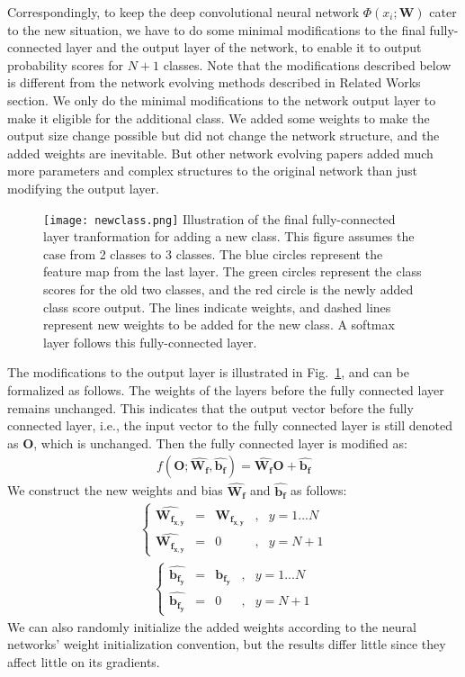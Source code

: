 Correspondingly, to keep the deep convolutional neural network $\Phi(x_i; \mathbf{W})$ cater to the new situation, we have to do some minimal modifications to the final fully-connected layer and the output layer of the network, to enable it to output probability scores for $N+1$ classes. Note that the modifications described below is different from the network evolving methods described in Related Works section. We only do the minimal modifications to the network output layer to make it eligible for the additional class. We added some weights to make the output size change possible but did not change the network structure, and the added weights are inevitable. But other network evolving papers added much more parameters and complex structures to the original network than just modifying the output layer.
\begin{figure}[!htp]
	\centering
	\texttt{[image: newclass.png]}
	{Illustration of the final fully-connected layer tranformation for adding a new class. This figure assumes the case from 2 classes to 3 classes. The blue circles represent the feature map from the last layer. The green circles represent the class scores for the old two classes, and the red circle is the newly added class score output. The lines indicate weights, and dashed lines represent new weights to be added for the new class. A softmax layer follows this fully-connected layer.}
	\label{fig:newclass}
\end{figure}
The modifications to the output layer is illustrated in Fig.~\ref{fig:newclass}, and can be formalized as follows. The weights of the layers before the fully connected layer remains unchanged. This indicates that the output vector before the fully connected layer, i.e., the input vector to the fully connected layer is still denoted as $\mathbf{O}$, which is unchanged. Then the fully connected layer is modified as:
\begin{align}
f(\mathbf{O}; \hat{\mathbf{W_f}}, \hat{\mathbf{b_f}}) =  \hat{\mathbf{W_f}}\mathbf{O} + \hat{\mathbf{b_f}}
\end{align}
We construct the new weights and bias $\hat{\mathbf{W_f}}$ and $\hat{\mathbf{b_f}}$ as follows:
\begin{align}
\left\{
	\begin{aligned}
	\hat{\mathbf{W_{f_{x,y}}}} & = & \mathbf{W_{f_{x,y}}}& ,& y = 1...N\\
	\hat{\mathbf{W_{f_{x,y}}}} & = & 0&,& y = N+1	
	\end{aligned}
\right.
\end{align}
\begin{align}
\left\{
\begin{aligned}
\hat{\mathbf{b_{f_{y}}}} & = & \mathbf{b_{f_{y}}}& ,& y = 1...N\\
\hat{\mathbf{b_{f_{y}}}} & = & 0&,& y = N+1	
\end{aligned}
\right.
\end{align}
We can also randomly initialize the added weights according to the neural networks' weight initialization convention, but the results differ little since they affect little on its gradients.

